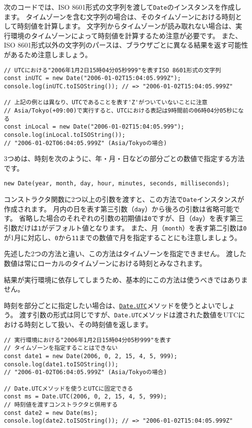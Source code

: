 次のコードでは、ISO
8601形式の文字列を渡して\texttt{Date}のインスタンスを作成します。
タイムゾーンを含む文字列の場合は、そのタイムゾーンにおける時刻として時刻値を計算します。
文字列からタイムゾーンが読み取れない場合は、実行環境のタイムゾーンによって時刻値を計算するため注意が必要です。
また、ISO
8601形式以外の文字列のパースは、ブラウザごとに異なる結果を返す可能性があるため注意しましょう。

\begin{lstlisting}
// UTCにおける"2006年1月2日15時04分05秒999"を表すISO 8601形式の文字列
const inUTC = new Date("2006-01-02T15:04:05.999Z");
console.log(inUTC.toISOString()); // => "2006-01-02T15:04:05.999Z"

// 上記の例とは異なり、UTCであることを表す'Z'がついていないことに注意
// Asia/Tokyo(+09:00)で実行すると、UTCにおける表記は9時間前の06時04分05秒になる
const inLocal = new Date("2006-01-02T15:04:05.999");
console.log(inLocal.toISOString()); 
// "2006-01-02T06:04:05.999Z" (Asia/Tokyoの場合)
\end{lstlisting}

3つめは、時刻を次のように、年・月・日などの部分ごとの数値で指定する方法です。

\begin{lstlisting}
new Date(year, month, day, hour, minutes, seconds, milliseconds);
\end{lstlisting}

コンストラクタ関数に2つ以上の引数を渡すと、この方法で\texttt{Date}インスタンスが作成されます。
月内の日を表す第三引数（\texttt{day}）から後ろの引数は省略可能です。
省略した場合のそれぞれの引数の初期値は\texttt{0}ですが、日（\texttt{day}）を表す第三引数だけは\texttt{1}がデフォルト値となります。
また、月（\texttt{month}）を表す第二引数は\texttt{0}が1月に対応し、\texttt{0}から\texttt{11}までの数値で月を指定することにも注意しましょう。

先述した2つの方法と違い、この方法はタイムゾーンを指定できません。
渡した数値は常にローカルのタイムゾーンにおける時刻とみなされます。

結果が実行環境に依存してしまうため、基本的にこの方法は使うべきではありません。

時刻を部分ごとに指定したい場合は、\href{https://developer.mozilla.org/ja/docs/Web/JavaScript/Reference/Global_Objects/Date/UTC}{\texttt{Date.UTC}}メソッドを使うとよいでしょう。
渡す引数の形式は同じですが、\texttt{Date.UTC}メソッドは渡された数値をUTCにおける時刻として扱い、その時刻値を返します。

\begin{lstlisting}
// 実行環境における"2006年1月2日15時04分05秒999"を表す
// タイムゾーンを指定することはできない
const date1 = new Date(2006, 0, 2, 15, 4, 5, 999);
console.log(date1.toISOString()); 
// "2006-01-02T06:04:05.999Z" (Asia/Tokyoの場合)

// Date.UTCメソッドを使うとUTCに固定できる
const ms = Date.UTC(2006, 0, 2, 15, 4, 5, 999);
// 時刻値を渡すコンストラクタと併用する
const date2 = new Date(ms);
console.log(date2.toISOString()); // => "2006-01-02T15:04:05.999Z"
\end{lstlisting}

